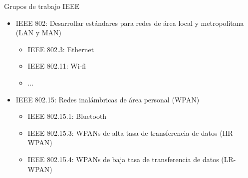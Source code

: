\documentclass[aspectratio=169]{beamer}
\begin{document}
\begin{frame}{Grupos de trabajo IEEE} 

\begin{minipage}[c]{1.0\linewidth}
	\begin{minipage}[c]{0.6\linewidth}
		\begin{itemize}
			\item IEEE 802: Desarrollar estándares para redes de área local y metropolitana (LAN y MAN)
			\begin{itemize}
				\item IEEE 802.3: Ethernet
				\item IEEE 802.11: Wi-fi
				\item ...
			\end{itemize}
			\vspace{10px}
			\item IEEE 802.15: Redes inalámbricas de área personal (WPAN)
			\vspace{5px}
			\begin{itemize}
				\item IEEE 802.15.1: Bluetooth
				\item IEEE 802.15.3: WPANs de alta tasa de transferencia de datos (HR-WPAN)			
				\item IEEE 802.15.4: WPANs de baja tasa de transferencia de datos (LR-WPAN)
			\end{itemize}
		\end{itemize}
	\end{minipage}
	\begin{minipage}[c]{0.35\linewidth}
		\begin{figure}[H]

\end{figure}
\end{minipage}
\end{minipage}
\end{frame}
\end{document}
